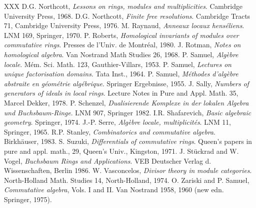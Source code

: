\begin{thebibliography}{XXX}
 D.G. Northcott, \textit{Lessons on rings, modules and multiplicities}. Cambridge University Press, 1968.
 D.G. Northcott, \textit{Finite free resolutions}. Cambridge Tracts 71, Cambridge University Press, 1976.
 M. Raynaud, \textit{Anneaux locaux hens\'eliens}. LNM 169, Springer, 1970.
 P. Roberts, \textit{Homological invariants of modules over commutative rings}. Presses de l'Univ. de Montr\'eal, 1980.
 J. Rotman, \textit{Notes on homological algebra}. Van Nostrand Math Studies 26, 1968.
 P. Samuel, \textit{Alg\`ebre locale}. M\'em. Sci. Math. 123, Gauthier-Villars, 1953.
 P. Samuel, \textit{Lectures on unique factorisation domains}. Tata Inst., 1964.
 P. Samuel, \textit{M\'ethodes d'alg\`ebre abstraite en g\'eom\'etrie alg\'ebrique}. Springer Ergebnisse, 1955.
 J. Sally, \textit{Numbers of generators of ideals in local rings}. Lecture Notes in Pure and Appl. Math. 35, Marcel Dekker, 1978.
 P. Schenzel, \textit{Dualisierende Komplexe in der lokalen Algebra und Buchsbaum-Ringe}. LNM 907, Springer 1982.
 I.R. Shafarevich, \textit{Basic algebraic geometry}. Springer, 1974.
 J.-P. Serre, \textit{Alg\`ebre locale, multiplicit\'es}. LNM 11, Springer, 1965.
 R.P. Stanley, \textit{Combinatorics and commutative algebra}. Birkh\"auser, 1983.
 S. Suzuki, \textit{Differentials of commutative rings}. Queen's papers in pure and appl. math., 29, Queen's Univ., Kingston, 1971.
 J. St\"uckrad and W. Vogel, \textit{Buchsbaum Rings and Applications}. VEB Deutscher Verlag d. Wissenschaften, Berlin 1986.
 W. Vasconcelos, \textit{Divisor theory in module categories}. North-Holland Math. Studies 14, North-Holland, 1974.
 O. Zariski and P. Samuel, \textit{Commutative algebra}, Vols. I and II. Van Nostrand 1958, 1960 (new edn. Springer, 1975).
\end{thebibliography}

